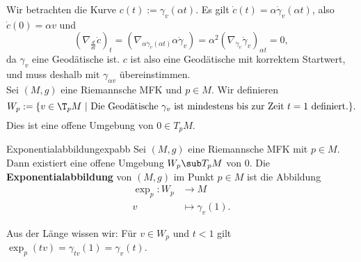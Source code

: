 \begin{beweis}
Wir betrachten die Kurve $c(t) := \gamma_v (\alpha t)$. Es gilt $\dot{c} (t) = \alpha \dot{\gamma}_v (\alpha t)$, also $\dot{c}(0) = \alpha v$ und 
\begin{equation}
\left( \nabla_\frac{d}{dt} \dot{c} \right)_t = \left( \nabla_{\alpha \dot{\gamma}_v (\alpha t)} \alpha \dot{\gamma}_v \right) = \alpha^2 \left( \nabla_{\dot{\gamma}_v} \dot{\gamma}_v\right)_{\alpha t} = 0,
\end{equation}
da $\gamma_v$ eine Geodätische ist. $c$ ist also eine Geodätische mit korrektem Startwert, und muss deshalb mit $\gamma_{\alpha v}$ übereinstimmen.\\
Sei $(M,g)$ eine Riemannsche MFK und $p \in M$. Wir definieren
\begin{equation}
W_p  := \{ v \in \T_pM \ | \ \text{Die Geodätische} \ \gamma_v \ \text{ist mindestens bis zur Zeit} \ t=1 \ \text{definiert.}\}.
\end{equation}
Dies ist eine offene Umgebung von $0 \in T_pM$.
\end{beweis}
\begin{definition}{Exponentialabbildung}{expabb}
Sei $(M,g)$ eine Riemannsche MFK mit $p \in M$. Dann existiert eine offene Umgebung $W_p \sub T_pM$ von $0$. Die \textbf{Exponentialabbildung} von $(M,g)$ im Punkt $p \in M$ ist die Abbildung
\begin{align}
\exp_p: W_p &\to M \\
v &\mapsto \gamma_v (1).
\end{align}
\end{definition}
Aus der Länge wissen wir: Für $v \in W_p$ und $t<1$ gilt $\exp_p (tv) = \gamma_{tv} (1) = \gamma_v (t)$.
